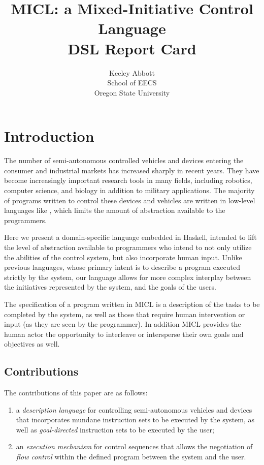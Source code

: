 \documentclass[11pt]{article}
\begin{document}
\title{\textbf{MICL: a Mixed-Initiative Control Language}
\\ DSL Report Card}

\author{Keeley Abbott \\
School of EECS \\
Oregon State University
}

\maketitle

\section{Introduction}
\label{sec:intro}
The number of semi-autonomous controlled vehicles and devices entering the
consumer and industrial markets has increased sharply in recent years. They
have become increasingly important research tools in many fields, including
robotics, computer science, and biology in addition to military
applications. The majority of programs written to control these devices and
vehicles are written in low-level languages like , which limits the
amount of abstraction available to the programmers.

Here we present a domain-specific language embedded in Haskell, intended to
lift the level of abstraction available to programmers who intend to not only
utilize the abilities of the control system, but also incorporate human
input. Unlike previous languages, whose primary intent is to describe a
program executed strictly by the system, our language allows for more complex
interplay between the initiatives represented by the system, and the goals
of the users.

The specification of a program written in MICL is a description of the
tasks to be completed by the system, as well as those that require human
intervention or input (as they are seen by the programmer). In addition
MICL provides the human actor the opportunity to interleave or
intersperse their own goals and objectives as well.

\subsection{Contributions}
\label{sec:intro:contributions}
The contributions of this paper are as follows:

\begin{enumerate}[label=C\arabic*.,ref=C\arabic*,leftmargin=*]
\item a \emph{description language} for controlling semi-autonomous
  vehicles and devices that incorporates mundane instruction sets to be
  executed by the system, as well as \emph{goal-directed} instruction sets to
  be executed by the user;
\item an \emph{execution mechanism} for control sequences that allows the
  negotiation of \emph{flow control} within the defined program between the
  system and the user.
\end{enumerate}
\end{document}
